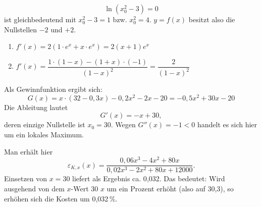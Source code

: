 \[ \ln(x_0^2 - 3) = 0 \]
ist gleichbedeutend mit $x_0^2 - 3 = 1$ bzw. $x_0^2 = 4$. $y = f(x)$ besitzt also die Nullstellen $-2$ und $+2$.

\begin{enumerate}[label=\alph*)]
  \item $f'(x) = 2(1 \cdot e^x + x \cdot e^x) = 2(x + 1)e^x$
  \item $f'(x) = \dfrac{1 \cdot (1 - x) - (1 + x) \cdot (-1)}{(1 - x)^2} = \dfrac{2}{(1 - x)^2}$
\end{enumerate}

Als Gewinnfunktion ergibt sich:
\[ G(x) = x \cdot (32 - 0{,}3x) - 0{,}2x^2 - 2x - 20 = -0{,}5x^2 + 30x - 20 \]
Die Ableitung lautet
\[ G'(x) = -x + 30 , \]
deren einzige Nullstelle ist $x_0 = 30$.
Wegen $G''(x) = -1 < 0$ handelt es sich hier um ein lokales Maximum.

Man erhält hier
\[ \varepsilon_{K,x}(x) = \frac{0{,}06x^3 - 4x^2 + 80x}{0{,}02x^3 - 2x^2 + 80x + 12000} . \]
Einsetzen von $x = 30$ liefert als Ergebnis ca. 0{,}032. Das bedeutet: Wird ausgehend von dem $x$-Wert 30 $x$ um ein Prozent erhöht (also auf 30{,}3), so erhöhen sich die Kosten um 0{,}032\,\%.

